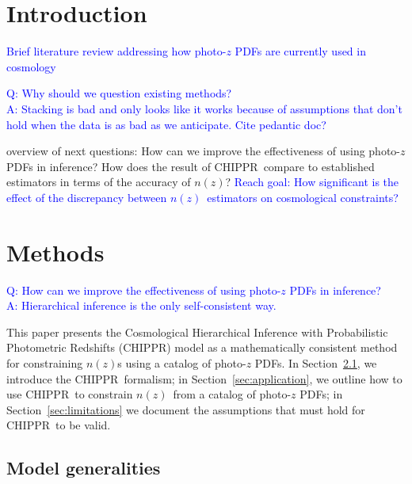 \documentclass[iop]{emulateapj}
\newcommand{\chippr}{CHIPPR}
\newcommand{\nz}{$n(z)$}
\newcommand{\pzpdf}{photo-$z$ PDF}
\begin{document}
\maketitle

\section{Introduction}
\label{sec:introduction}

\textcolor{blue}{Brief literature review addressing how \pzpdf s are currently 
used in cosmology}


\textcolor{blue}{Q: Why should we question existing methods?\\
A: Stacking is bad and only looks like it works because of assumptions that 
don't hold when the data is as bad as we anticipate.  Cite pedantic doc?}

overview of next questions: How can we improve the effectiveness of using 
\pzpdf s in inference?  How does the result of \chippr\ compare to established 
estimators in terms of the accuracy of \nz ?  \textcolor{blue}{Reach goal: How 
significant is the effect of the discrepancy between \nz\ estimators on 
cosmological constraints?}

\section{Methods}
\label{sec:methods}

\textcolor{blue}{Q: How can we improve the effectiveness of using \pzpdf s in 
inference?\\
A: Hierarchical inference is the only self-consistent way.}

This paper presents the Cosmological Hierarchical Inference with Probabilistic 
Photometric Redshifts (\chippr ) model as a mathematically consistent method 
for constraining \nz s using a catalog of \pzpdf s.
In Section~\ref{sec:model}, we introduce the \chippr\ formalism; in 
Section~\ref{sec:application}, we outline how to use \chippr\ to constrain \nz\ 
from a catalog of \pzpdf s; in Section~\ref{sec:limitations} we document the 
assumptions that must hold for \chippr\ to be valid.

\subsection{Model generalities}
\label{sec:model}
\end{document}

